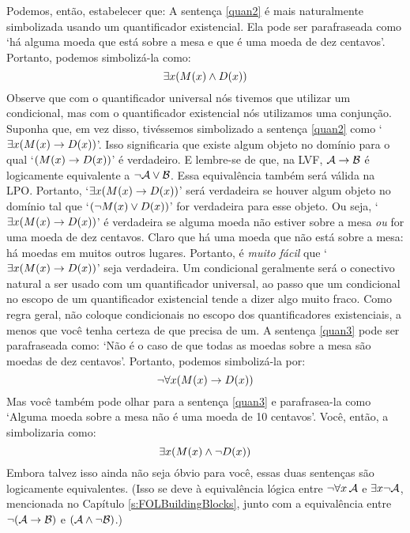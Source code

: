 Podemos, então, estabelecer que:
A sentença \ref{quan2} é mais naturalmente simbolizada usando um quantificador existencial.
Ela pode ser parafraseada como `há alguma moeda que está sobre a mesa e que é uma moeda de dez centavos'.
Portanto, podemos simbolizá-la como:
$$\exists x(\mathord{M}(x) \wedge \mathord{D}(x))$$
Observe que com o quantificador universal nós tivemos que utilizar um condicional, mas com o quantificador existencial nós utilizamos uma conjunção.
Suponha que, em vez disso, tivéssemos simbolizado a sentença \ref{quan2} como `$\exists x(\mathord{M}(x) \rightarrow \mathord{D}(x))$'.
Isso significaria que existe algum objeto no domínio para o qual \hbox{`$(\mathord{M}(x) \rightarrow \mathord{D}(x))$'} é verdadeiro.
E lembre-se de que, na LVF, \hbox{$\mathcal{A} \rightarrow \mathcal{B}$} é logicamente equivalente a $\neg\mathcal{A} \vee \mathcal{B}$.
Essa equivalência também será válida na LPO.
Portanto, `$\exists x(\mathord{M}(x) \rightarrow \mathord{D}(x))$' será verdadeira se houver algum objeto no domínio tal que `$(\neg \mathord{M}(x) \vee \mathord{D}(x))$' for verdadeira para esse objeto.
Ou seja, `$\exists x (\mathord{M}(x) \rightarrow \mathord{D}(x))$' é verdadeira se alguma moeda não estiver sobre a mesa \emph{ou} for uma moeda de dez centavos.
Claro que há uma moeda que não está sobre a mesa: há moedas em muitos outros lugares.
Portanto, é \emph{muito fácil} que `$\exists x(\mathord{M}(x) \rightarrow \mathord{D}(x))$' seja verdadeira.
Um condicional geralmente será o conectivo natural a ser usado com um quantificador universal, ao passo que um condicional no escopo de um quantificador existencial tende a dizer algo muito fraco.
Como regra geral, não coloque condicionais no escopo dos quantificadores existenciais, a menos que você tenha certeza de que precisa de um.
A sentença \ref{quan3} pode ser parafraseada como:
`Não é o caso de que todas as moedas sobre a mesa são moedas de dez centavos'.
Portanto, podemos simbolizá-la por:
$$\neg \forall x(\mathord{M}(x) \rightarrow \mathord{D}(x))$$
Mas você também pode olhar para a sentença \ref{quan3} e parafrasea-la como `Alguma moeda sobre a mesa não é uma moeda de 10 centavos'.
Você, então, a simbolizaria como:
$$\exists x(\mathord{M}(x) \wedge \neg \mathord{D}(x))$$
Embora talvez isso ainda não seja óbvio para você, essas duas sentenças são logicamente equivalentes.
(Isso se deve à equivalência lógica entre $\neg\forall x\,\mathcal{A}$ e $\exists x\neg\mathcal{A}$, mencionada no Capítulo \ref{s:FOLBuildingBlocks}, junto com a equivalência entre $\neg(\mathcal{A}\rightarrow\mathcal{B})$ e $(\mathcal{A}\wedge\neg\mathcal{B})$.)

